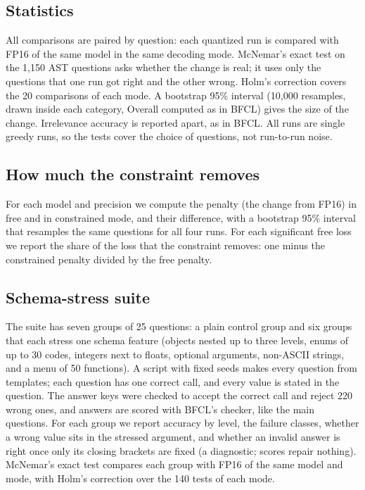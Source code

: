 \documentclass[conference]{IEEEtran}
\begin{document}
\subsection{Statistics}
All comparisons are paired by question: each quantized run is compared with FP16 of the same model
in the same decoding mode. McNemar's exact test on the 1,150 AST questions asks whether the change
is real; it uses only the questions that one run got right and the other wrong. Holm's correction
covers the 20 comparisons of each mode. A bootstrap 95\% interval (10,000 resamples, drawn inside
each category, Overall computed as in BFCL) gives the size of the change. Irrelevance accuracy is
reported apart, as in BFCL. All runs are single greedy runs, so the tests cover the choice of
questions, not run-to-run noise.

\subsection{How much the constraint removes}
For each model and precision we compute the penalty (the change from FP16) in free and in
constrained mode, and their difference, with a bootstrap 95\% interval that resamples the same
questions for all four runs. For each significant free loss we report the share of the loss that
the constraint removes: one minus the constrained penalty divided by the free penalty.

\subsection{Schema-stress suite}
The suite has seven groups of 25 questions: a plain control group and six groups that each stress one
schema feature (objects nested up to three levels, enums of up to 30 codes, integers next to floats,
optional arguments, non-ASCII strings, and a menu of 50 functions). A script with fixed seeds makes
every question from templates; each question has one correct call, and every value is stated in the
question. The answer keys were checked to accept the correct call and reject 220 wrong ones, and
answers are scored with BFCL's checker, like the main questions. For each group we report accuracy
by level, the failure classes, whether a wrong value sits in the stressed argument, and whether an
invalid answer is right once only its closing brackets are fixed (a diagnostic; scores repair
nothing). McNemar's exact test compares each group with FP16 of the same model and mode, with Holm's
correction over the 140 tests of each mode.
\end{document}
